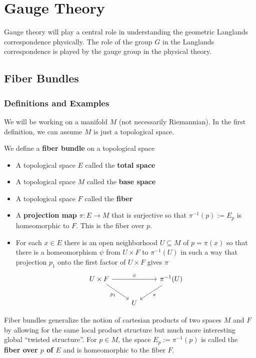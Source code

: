 \chapter{Gauge Theory\label{ch:gauge}}

	Gauge theory will play a central role in understanding the geometric Langlands correspondence physically. The role of the group $G$ in the Langlands correspondence is played by the gauge group in the physical theory. 

	\section{Fiber Bundles}
	\subsection{Definitions and Examples}
		We will be working on a manifold $M$ (not necessarily Riemannian). In the first definition, we can assume $M$ is just a topological space. 
	\begin{defn}
		We define a \textbf{fiber bundle} on a topological space
		\begin{itemize}
			\item A topological space $E$ called the \textbf{total space}
			\item A topological space $M$ called the \textbf{base space}
			\item A topological space $F$ called the \textbf{fiber} 
			\item A \textbf{projection map} $\pi: E \to M$ that is surjective so that $\pi^{-1}(p) := E_p$ is homeomorphic to $F$. This is the fiber over $p$.
			\item For each $x \in E$ there is an open neighborhood $U \subseteq M$ of $p = \pi(x)$ so that there is a homeomorphism $\psi$ from $U \times F$ to $\pi^{-1}(U)$ in such a way that projection $p_1$ onto the first factor of $U \times F$ gives $\pi$
			\[
			\begin{tikzcd}
				U \times F \arrow[rd,swap,"p_1"] \arrow[rr,"\psi"] && \pi^{-1}(U) \arrow[dl,"\pi"]\\
				& U &
			\end{tikzcd}
			\]
		\end{itemize}
	\end{defn}
	Fiber bundles generalize the notion of cartesian products of two spaces $M$ and $F$ by allowing for the same local product structure but much more interesting global ``twisted structure''. For $p \in M$, the space $E_{p} := \pi^{-1}(p)$ is called the \textbf{fiber over $p$ of $E$} and is homeomorphic to the fiber $F$. 
	
